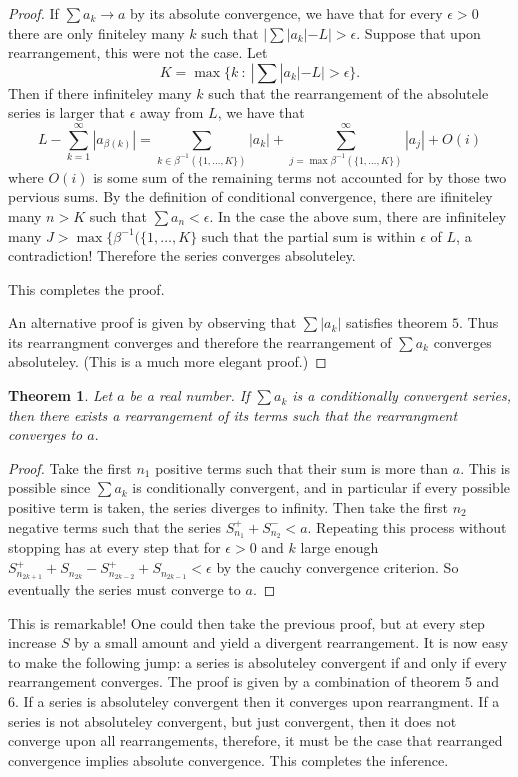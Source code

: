 \documentclass[letter]{article}
\newtheorem{theorem}{Theorem}
\newenvironment{menumerate}{%
  \edef\backupindent{\the\parindent}%
  \enumerate%
  \setlength{\parindent}{\backupindent}%
}{\endenumerate}
\begin{document}
\begin{menumerate}
\begin{proof}
			If $\sum {a_k} \to a$ by its absolute convergence, we have that for every $\epsilon > 0$ there are only finiteley many $k$ such that $|\sum |a_k| - L| > \epsilon$. Suppose that upon rearrangement, this were not the case. Let $$K  =\max\{k\ :\ |\sum |a_k| - L| > \epsilon \}.$$ Then if there infiniteley many $k$ such that the rearrangement of the absolutele series is larger that $\epsilon$ away from $L$, we have that 
			$$L - \sum_{k=1}^\infty |a_{\beta(k)}| = \sum_{k \in \beta^{-1}(\{1,\dots,K\})} |a_k| + \sum^\infty_{j = \max \beta^{-1}(\{1,\dots,K\})}|a_j| + O(i)$$ 
			where $O(i)$ is some sum of the remaining terms not accounted for by those two pervious sums. By the definition of conditional convergence, there are ifiniteley many $n > K$ such that $\sum a_n < \epsilon$. In the case the above sum, there are infiniteley many $J > \max\{\beta^{-1}(\{1,\dots,K\}$ such that the partial sum is within $\epsilon$ of $L$, a contradiction! Therefore the series converges absoluteley.

			This completes the proof.

			An alternative proof is given by observing that $\sum |a_k|$ satisfies theorem $5.$ Thus its rearrangment converges and therefore the rearrangement of $\sum a_k$ converges absoluteley. (This is a much more elegant proof.)
		\end{proof}
		

		\item 

		\begin{theorem}
			Let $a$ be a real number. If $\sum a_k$ is a conditionally convergent series, then there exists a rearrangement of its terms such that the rearrangment converges to $a.$
		\end{theorem}
		\begin{proof}
			Take the first $n_1$ positive terms such that their sum is more than $a.$ This is possible since $\sum a_k$ is conditionally convergent, and in particular if every possible positive term is taken, the series diverges to infinity. Then take the first $n_2$ negative terms such that the series $S_{n_1}^++S_{n_2}^- <a. $ Repeating this process without stopping has at every step that for $\epsilon > 0$ and $k$ large enough $S_{n_{2k+1}}^++S_{n_{2k}} - S_{n_{2k-2}}^++S_{n_{2k-1}} < \epsilon$ by the cauchy convergence criterion. So eventually the series must converge to $a$.
		\end{proof} 

		This is remarkable! One could then take the previous proof, but at every step increase $S$ by a small amount and yield a divergent rearrangement. It is now easy to make the following jump: a series is absoluteley convergent if and only if every rearrangement converges. The proof is given by a combination of theorem 5 and 6. If a series is absoluteley convergent then it converges upon rearrangment. If a series is not absoluteley convergent, but just convergent, then it does not converge upon all rearrangements, therefore, it must be the case that rearranged convergence implies absolute convergence. This completes the inference.
	\end{menumerate}
\end{document}
